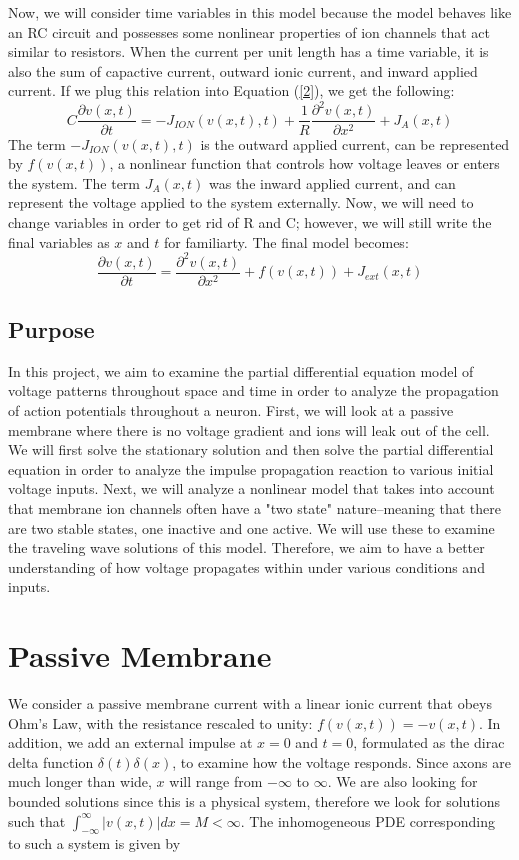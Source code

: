 \documentclass[12pt]{article}
\begin{document}
Now, we will consider time variables in this model because the model behaves like an RC circuit and possesses some nonlinear properties of ion channels that act similar to resistors. When the current per unit length has a time variable, it is also the sum of capactive current, outward ionic current, and inward applied current. If we plug this relation into Equation (\ref{2}), we get the following:
\[C\frac{\partial{v(x,t)}}{\partial{t}}=-J_{ION}(v(x,t),t)+\frac{1}{R}\frac{\partial^2{v(x,t)}}{\partial{x}^2}+J_A(x,t)\]
The term $-J_{ION}(v(x,t),t)$ is the outward applied current, can be represented by $f(v(x,t))$, a nonlinear function that controls how voltage leaves or enters the system. The term $J_A(x,t)$ was the inward applied current, and can represent the voltage applied to the system externally. Now, we will need to change variables in order to get rid of R and C; however, we will still write the final variables as $x$ and $t$ for familiarty. The final model becomes:
\[\frac{\partial{v(x,t)}}{\partial{t}}=\frac{\partial^2{v(x,t)}}{\partial{x}^2}+f(v(x,t))+J_{ext}(x,t)\]

\subsection{Purpose}
In this project, we aim to examine the partial differential equation model of voltage patterns throughout space and time in order to analyze the propagation of action potentials throughout a neuron. First, we will look at a passive membrane where there is no voltage gradient and ions will leak out of the cell. We will first solve the stationary solution and then solve the partial differential equation in order to analyze the impulse propagation reaction to various initial voltage inputs. Next, we will analyze a nonlinear model that takes into account that membrane ion channels often have a "two state" nature--meaning that there are two stable states, one inactive and one active. We will use these to examine the traveling wave solutions of this model. Therefore, we aim to have a better understanding of how voltage propagates within under various conditions and inputs.

\section{Passive Membrane}
We consider a passive membrane current with a linear ionic current that obeys Ohm's Law, with the resistance rescaled to unity: $f(v(x,t)) = -v(x,t)$. In addition, we add an external impulse at $x=0$ and $t=0$, formulated as the dirac delta function $\delta(t) \delta(x)$, to examine how the voltage responds. Since axons are much longer than wide, $x$ will range from $-\infty$ to $\infty$. We are also looking for bounded solutions since this is a physical system, therefore we look for solutions such that $\int_{-\infty}^{\infty}|v(x,t)|dx = M < \infty$. The inhomogeneous PDE corresponding to such a system is given by
\end{document}

